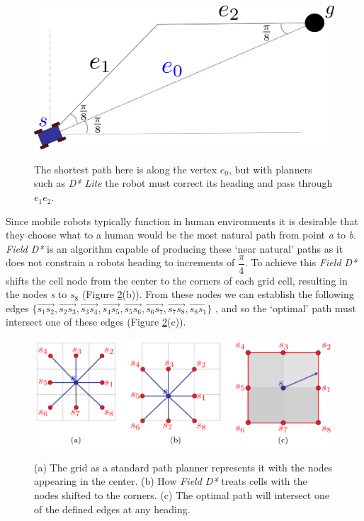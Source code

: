 \begin{figure}[htbp]

\center \includegraphics[width=400pt]{illustrations/shortest_path}\\
\caption{The shortest path here is along the vertex $e_{0}$, but with planners such as \textit{D* Lite} the robot must correct its heading and pass through $e_{1}e_{2}$. \cite{FIELD}} 
\label{Figure: Shortest Path.}

\end{figure}

\newpage

\noindent
Since mobile robots typically function in human environments it is desirable that they choose what to a human would be the most natural path from point \textit{a} to \textit{b}. \textit{Field D*} \cite{FIELD2} is an algorithm capable of producing these `near natural' paths as it does not constrain a robots heading to increments of $\dfrac{\pi}{4}$. To achieve this \textit{Field D*} shifts the cell node from the center to the corners of each grid cell, resulting in the nodes \textit{s} to $s_{8}$ (Figure \ref{Figure: Optimal.}(b)). From these nodes we can establish the following edges $\lbrace \overrightarrow{s_{1}s_{2}}, \overrightarrow{s_{2}s_{3}}, \overrightarrow{s_{3}s_{4}}, \overrightarrow{s_{4}s_{5}}, \overrightarrow{s_{5}s_{6}}, \overrightarrow{s_{6}s_{7}}, \overrightarrow{s_{7}s_{8}}, \overrightarrow{s_{8}s_{1}} \rbrace$ \cite{FIELD}, and so the `optimal' path must intersect one of these edges (Figure \ref{Figure: Optimal.}(c)).

\begin{figure}[htbp]

\center \includegraphics[width=350pt]{illustrations/nodes}\\
\caption{(a) The grid as a standard path planner represents it with the nodes appearing in the center. (b) How \textit{Field D*} treats cells with the nodes shifted to the corners. (c) The optimal path will intersect one of the defined edges at any heading. \cite{FIELD}} 
\label{Figure: Optimal.}

\end{figure}

